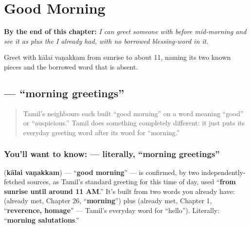
\chapter{Good Morning}
\label{ch:ta-good-morning}

\begin{chapteropening}
\textbf{By the end of this chapter:} \emph{I can greet someone with   before mid-morning and see it as  plus the  I already had, with no borrowed blessing-word in it.}

Greet with kālai vaṇakkam from sunrise to about 11, naming its two known pieces and the borrowed word that is absent.
\end{chapteropening}

\section[\texorpdfstring{\ta{காலை} \ta{வணக்கம்} (kālai vaṇakkam)}{காலை வணக்கம் (kālai vaṇakkam)}]{  — \textquotedblleft{}morning greetings\textquotedblright{}}

\label{lesson:TA-C29-kaalai-vanakkam}



\begin{quote}
Tamil's neighbours each built \textquotedblleft{}good morning\textquotedblright{} on a word meaning \textquotedblleft{}good\textquotedblright{} or \textquotedblleft{}auspicious.\textquotedblright{} Tamil does something completely different: it just puts its everyday greeting word after its word for \textquotedblleft{}morning.\textquotedblright{}
\end{quote}

\subsection*{You'll want to know:   — literally, \textquotedblleft{}morning greetings\textquotedblright{}}
\textbf{ } (\textbf{kālai vaṇakkam}) — \textquotedblleft{}\textbf{good morning}\textquotedblright{} — is confirmed, by two independently-fetched sources, as Tamil's standard greeting for this time of day, used \textquotedblleft{}\textbf{from sunrise until around 11 AM}.\textquotedblright{} It's built from two words you already have: \textbf{} (already met, Chapter 26, \textquotedblleft{}\textbf{morning}\textquotedblright{}) plus \textbf{} (already met, Chapter 1, \textquotedblleft{}\textbf{reverence, homage}\textquotedblright{} — Tamil's everyday word for \textquotedblleft{}hello\textquotedblright{}). Literally: \textquotedblleft{}\textbf{morning salutations}.\textquotedblright{}

